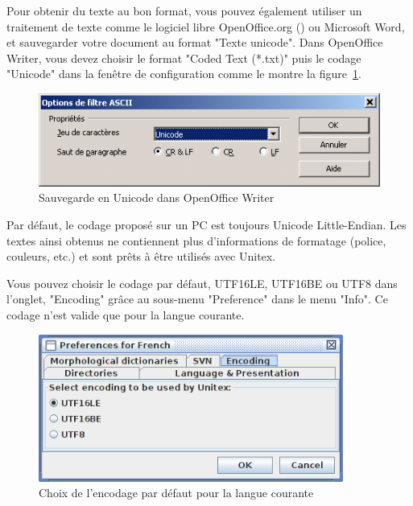 \noindent Pour obtenir du texte au bon format, vous pouvez également utiliser un traitement de
texte comme le logiciel libre OpenOffice.org (\cite{OpenOffice}) ou Microsoft Word, et sauvegarder
votre document au format "Texte unicode". Dans OpenOffice Writer, vous devez choisir le format
"Coded Text (*.txt)" puis le codage "Unicode" dans la fenêtre de configuration comme le montre la
figure~\ref{OfficeWriter}.

\begin{figure}[!ht]
\begin{center}
\includegraphics[width=12.5cm]{resources/img/fig2-4.png}
\caption{\label{OfficeWriter}Sauvegarde en Unicode dans OpenOffice Writer}
\end{center}
\end{figure}

\noindent Par défaut, le codage proposé sur un PC est toujours Unicode Little-Endian. Les textes 
ainsi obtenus ne contiennent plus d’informations de formatage (police, couleurs, etc.) et sont
prêts à être utilisés avec Unitex.

\bigskip
\noindent 
Vous pouvez choisir le codage par défaut, UTF16LE, UTF16BE ou UTF8 dans l'onglet, "Encoding" grâce
au sous-menu "Preference"  dans le menu "Info". Ce codage n'est valide que pour la langue
courante.

\begin{figure}[!ht]
\begin{center}
\includegraphics[width=10cm]{resources/img/fig2-5.png}
\caption{Choix de l'encodage par défaut pour la langue courante}
\end{center}
\end{figure}

